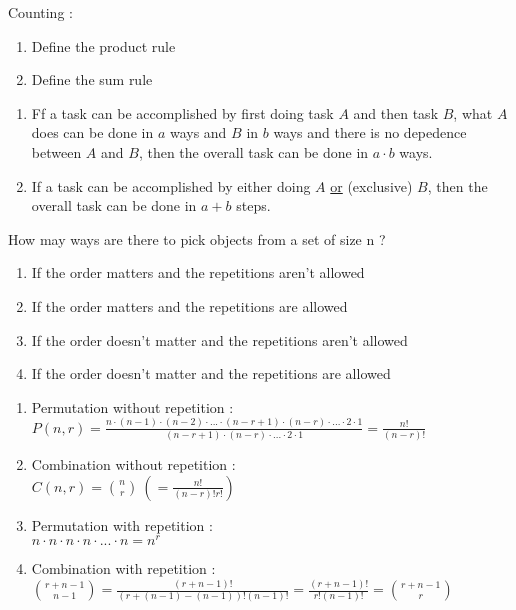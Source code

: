 \documentclass[12pt]{article}
\newcommand*{\xfield}[1]{\begin{mdframed}\centering #1\end{mdframed}\bigskip}
\newenvironment{note}{}{}
\begin{document}
\begin{note}
Counting :
	\xfield{\begin{enumerate}
		\item Define the product rule
		\item Define the sum rule
	\end{enumerate} }
	\xfield{\begin{enumerate}
		\item Ff a task can be accomplished by first doing task $A$ and then task $B$, what $A$ does can be done in $a$ ways and $B$ in $b$ ways and there is no depedence between $A$ and $B$, then the overall task can be done in $a\cdot b$ ways. 
		\item If a task can be accomplished by either doing $A$ \underline{or} (exclusive) $B$, then the overall task can be done in $a+b$ steps.
	\end{enumerate} }
\end{note}

\begin{note}
	\xfield{How may ways are there to pick objects from a set of size n ?\begin{enumerate}
		\item If the order matters and the repetitions aren't allowed
		\item If the order matters and the repetitions are allowed
		\item If the order doesn't matter and the repetitions aren't allowed
		\item If the order doesn't matter and the repetitions are allowed
	\end{enumerate} }
	\xfield{\begin{enumerate}
		\item Permutation without repetition :\\
			$P(n,r) = \frac{n\cdot(n-1)\cdot(n-2)\cdot ...\cdot(n-r+1)\cdot(n-r)\cdot ...\cdot 2\cdot 1}{(n-r+1)\cdot (n-r)\cdot ... \cdot 2 \cdot 1} = \frac{n!}{(n-r)!}$
		\item Combination without repetition :\\
		$C(n,r) = \binom{n}{r}\ (=\frac{n!}{(n-r)!r!})$
		\item Permutation with repetition :\\
		$n\cdot n\cdot n \cdot n \cdot ... \cdot n = n^r$
		\item Combination with repetition :\\
		$\binom{r+n-1}{n-1} = \frac{(r+n-1)!}{(r+(n-1)-(n-1))!(n-1)!} = \frac{(r+n-1)!}{r!(n-1)!} = \binom{r+n-1}{r}$
	\end{enumerate} }
\end{note}
\end{document}
